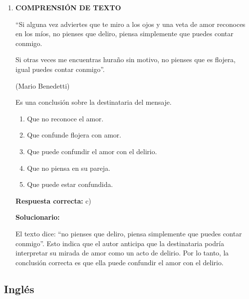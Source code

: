 \begin{enumerate}[resume]
	\vspace{2mm}
	\textbf{Solucionario:}
	
	Un orden expositivo general razonable es: antecedentes, definición, características, tipos o clases y conclusión:
	
	$III - V - IV - II - I$
	
	\vspace{6mm}
	
	\item \textbf{COMPRENSIÓN DE TEXTO}
	
	“Si alguna vez adviertes que te miro a los ojos y una veta de amor reconoces en los míos, no pienses que deliro, piensa simplemente que puedes contar conmigo.
	
	Si otras veces me encuentras huraño sin motivo, no pienses que es flojera, igual puedes contar conmigo”.
	
	\hfill (Mario Benedetti)
	
	Es una conclusión sobre la destinataria del mensaje.
	\begin{enumerate}[label=\alph*)]
		\item Que no reconoce el amor.
		\item Que confunde flojera con amor.
		\item Que puede confundir el amor con el delirio.
		\item Que no piensa en su pareja.
		\item Que puede estar confundida.
	\end{enumerate}
	\textbf{Respuesta correcta:} c)
	
	\vspace{2mm}
	\textbf{Solucionario:}
	
	El texto dice: “no pienses que deliro, piensa simplemente que puedes contar conmigo”. Esto indica que el autor anticipa que la destinataria podría interpretar su mirada de amor como un acto de delirio. Por lo tanto, la conclusión correcta es que ella puede confundir el amor con el delirio.
	
	\vspace{6mm}
	
\end{enumerate}

\subsection*{Inglés}

